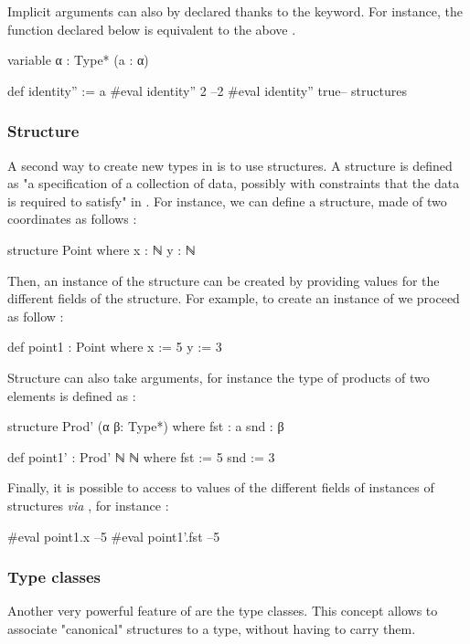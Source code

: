 Implicit arguments can also by declared thanks to the  keyword. For instance, the  function declared below is  equivalent to the above .

\begin{leancode}
variable {α : Type*} (a : α)

def identity'' := a
#eval identity'' 2 --2
#eval identity'' true-- structures
\end{leancode}

\subsubsection{Structure}

A second way to create new types in \Lean is to use structures. A structure is defined as "a specification of a collection of data, possibly with constraints that the data is required to satisfy" in \cite{noauthor_mathematics_nodate}. For instance, we can define a  structure, made of two coordinates as follows :
\begin{leancode}
structure Point where
  x : ℕ
  y : ℕ
\end{leancode}

Then, an instance of the structure can be created by providing values for the different fields of the structure. For example, to create an instance  of  we proceed as follow :
\begin{leancode}
def point1 : Point where
  x := 5
  y := 3
\end{leancode}

Structure can also take arguments, for instance the type  of products of two elements is defined as :
\begin{leancode}
structure Prod' (α β: Type*) where
  fst : a
  snd : β

def point1' : Prod' ℕ ℕ where
  fst := 5
  snd := 3
\end{leancode}

Finally, it is possible to access to values of the different fields of instances of structures \textit{via} , for instance :
\begin{leancode}
#eval point1.x --5
#eval point1'.fst --5 
\end{leancode}

\subsubsection{Type classes}
Another very powerful feature of \Lean are the type classes. This concept allows to associate %
"canonical" structures to a type, without having to carry them.


